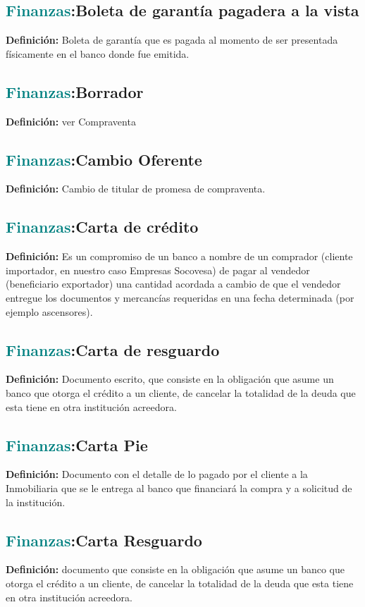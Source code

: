 \documentclass[12pt]{article}
\begin{document}
\subsection{\textcolor{teal}{Finanzas}:{Boleta de garantía pagadera a la vista}}
\textbf{Definición:} Boleta de garantía que es pagada al momento de ser presentada físicamente en el banco donde fue emitida.
\subsection{\textcolor{teal}{Finanzas}:{Borrador}}
\textbf{Definición:} ver Compraventa
\subsection{\textcolor{teal}{Finanzas}:{Cambio Oferente}}
\textbf{Definición:} Cambio de titular de promesa de compraventa.
\subsection{\textcolor{teal}{Finanzas}:{Carta de crédito}}
\textbf{Definición:} Es un compromiso de un banco a nombre de un comprador (cliente importador, en nuestro caso Empresas Socovesa) de pagar al vendedor (beneficiario exportador) una cantidad acordada a cambio de que el vendedor entregue los documentos y mercancías requeridas en una fecha determinada (por ejemplo ascensores).
\subsection{\textcolor{teal}{Finanzas}:{Carta de resguardo}}
\textbf{Definición:} Documento escrito, que consiste en la obligación que asume un banco que otorga el crédito a un cliente, de cancelar la totalidad de la deuda que esta tiene en otra institución acreedora.
\subsection{\textcolor{teal}{Finanzas}:{Carta Pie}}
\textbf{Definición:} Documento con el detalle de lo pagado por el cliente a la Inmobiliaria que se le entrega al banco que financiará la compra y a solicitud de la institución.
\subsection{\textcolor{teal}{Finanzas}:{Carta Resguardo}}
\textbf{Definición:} documento que consiste en la obligación que asume un banco que otorga el crédito a un cliente, de cancelar la totalidad de la deuda que esta tiene en otra institución acreedora.
\end{document}
